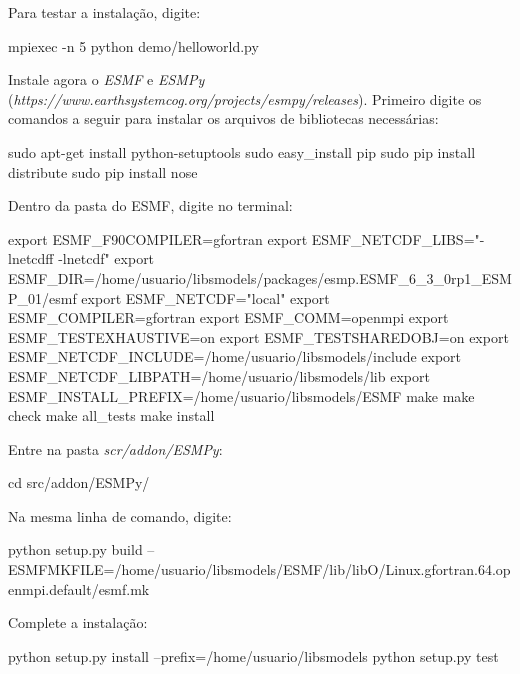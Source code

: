 \noindent Para testar a instalação, digite:
\bigskip

\begin{bashcode}
mpiexec -n 5 python demo/helloworld.py
\end{bashcode}
\bigskip

\noindent Instale agora o \textit{ESMF} e \textit{ESMPy} (\textcolor{bleu_cite}{\textit{https://www.earthsystemcog.org/projects/esmpy/releases}}). Primeiro digite os comandos a seguir para instalar os arquivos de bibliotecas necessárias:
\bigskip

\begin{bashcode}
sudo apt-get install python-setuptools
sudo easy_install pip
sudo pip install distribute
sudo pip install nose
\end{bashcode}
\bigskip

\noindent Dentro da pasta do ESMF, digite no terminal:
\bigskip

\begin{bashcode}[fontsize=\footnotesize]
export ESMF_F90COMPILER=gfortran
export ESMF_NETCDF_LIBS="-lnetcdff -lnetcdf"
export ESMF_DIR=/home/usuario/libsmodels/packages/esmp.ESMF_6_3_0rp1_ESMP_01/esmf
export ESMF_NETCDF="local"
export ESMF_COMPILER=gfortran
export ESMF_COMM=openmpi
export ESMF_TESTEXHAUSTIVE=on
export ESMF_TESTSHAREDOBJ=on
export ESMF_NETCDF_INCLUDE=/home/usuario/libsmodels/include
export ESMF_NETCDF_LIBPATH=/home/usuario/libsmodels/lib
export ESMF_INSTALL_PREFIX=/home/usuario/libsmodels/ESMF
make
make check
make all_tests
make install
\end{bashcode}
\bigskip

\noindent Entre na pasta \textit{scr/addon/ESMPy}:
\bigskip

\begin{bashcode}[fontsize=\scriptsize]
cd src/addon/ESMPy/
\end{bashcode}
\bigskip

\noindent Na mesma linha de comando, digite:
\bigskip

\begin{bashcode}[fontsize=\footnotesize]
python setup.py build
--ESMFMKFILE=/home/usuario/libsmodels/ESMF/lib/libO/Linux.gfortran.64.openmpi.default/esmf.mk
\end{bashcode}
\bigskip

\noindent Complete a instalação:
\bigskip

\begin{bashcode}
python setup.py install --prefix=/home/usuario/libsmodels
python setup.py test
\end{bashcode}
\bigskip

